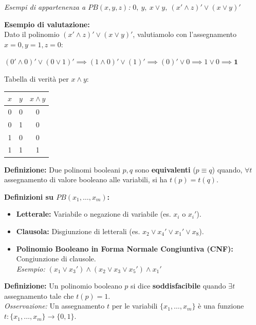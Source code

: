 \textit{Esempi di appartenenza a $PB(x,y,z)$:} $0, \ y, \ x \lor y, \ (x' \land z)' \lor (x \lor y)'$

\vspace{0.4cm}
\textbf{Esempio di valutazione:} \\
Dato il polinomio $(x' \land z)' \lor (x \lor y)'$, valutiamolo con l'assegnamento $x=0, y=1, z=0$:
\begin{center}
    $(0' \land 0)' \lor (0 \lor 1)' \implies (1 \land 0)' \lor (1)' \implies (0)' \lor 0 \implies 1 \lor 0 \implies \mathbf{1}$
\end{center}

\begin{minipage}{0.4\textwidth}
    \vspace{0.2cm}
    Tabella di verità per $x \land y$:
\end{minipage}
\begin{minipage}{0.5\textwidth}
    \begin{tabular}{c|c||c}
        $x$ & $y$ & $x \land y$ \\
        \hline
        0 & 0 & 0 \\
        0 & 1 & 0 \\
        1 & 0 & 0 \\
        1 & 1 & 1 \\
    \end{tabular}
\end{minipage}

\vspace{0.6cm}
\textbf{Definizione:} Due polinomi booleani $p, q$ sono \textbf{equivalenti} ($p \equiv q$) quando, $\forall t$ assegnamento di valore booleano alle variabili, si ha $t(p) = t(q)$.

\vspace{0.4cm}
\textbf{Definizioni su $PB(x_1, \dots, x_m)$:}
\begin{itemize}
    \item \textbf{Letterale:} Variabile o negazione di variabile (es. $x_i$ o $x_i'$).
    \item \textbf{Clausola:} Disgiunzione di letterali (es. $x_2 \lor x_4' \lor x_1' \lor x_8$).
    \item \textbf{Polinomio Booleano in Forma Normale Congiuntiva (CNF):} Congiunzione di clausole. \\
    \textit{Esempio:} $(x_1 \lor x_3') \land (x_2 \lor x_3 \lor x_5') \land x_1'$
\end{itemize}

\vspace{0.2cm}
\textbf{Definizione:} Un polinomio booleano $p$ si dice \textbf{soddisfacibile} quando $\exists t$ assegnamento tale che $t(p) = 1$. \\
\textit{Osservazione:} Un assegnamento $t$ per le variabili $\{x_1, \dots, x_m\}$ è una funzione $t: \{x_1, \dots, x_m\} \to \{0, 1\}$.

